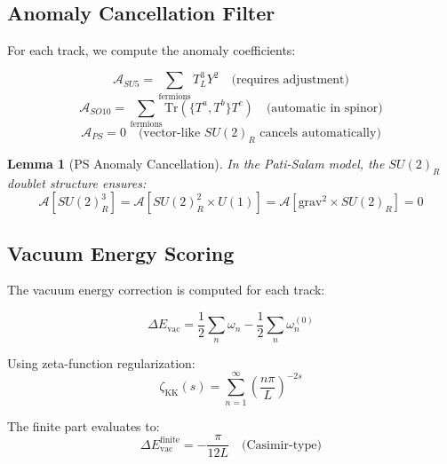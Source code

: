 \documentclass[11pt,a4paper]{article}
\newtheorem{lemma}[theorem]{Lemma}
\begin{document}
\subsection{Anomaly Cancellation Filter}
\label{subsec:anomaly-filter}

For each track, we compute the anomaly coefficients:

\begin{equation}
\label{eq:anomaly-su5}
\mathcal{A}_{SU5} = \sum_{\text{fermions}} T^3_L Y^2 \quad \text{(requires adjustment)}
\end{equation}
\begin{equation}
\label{eq:anomaly-so10}
\mathcal{A}_{SO10} = \sum_{\text{fermions}} \text{Tr}(\{T^a, T^b\} T^c) \quad \text{(automatic in spinor)}
\end{equation}
\begin{equation}
\label{eq:anomaly-ps}
\mathcal{A}_{PS} = 0 \quad \text{(vector-like $SU(2)_R$ cancels automatically)}
\end{equation}

\begin{lemma}[PS Anomaly Cancellation]
\label{lem:ps-anomaly}
In the Pati-Salam model, the $SU(2)_R$ doublet structure ensures:
\begin{equation}
\label{eq:ps-anomaly-cancel}
\mathcal{A}[SU(2)_R^3] = \mathcal{A}[SU(2)_R^2 \times U(1)] = \mathcal{A}[\text{grav}^2 \times SU(2)_R] = 0
\end{equation}
\end{lemma}

\subsection{Vacuum Energy Scoring}
\label{subsec:vacuum-scoring}

The vacuum energy correction is computed for each track:

\begin{equation}
\label{eq:delta-evac-general}
\Delta E_{\text{vac}} = \frac{1}{2} \sum_n \omega_n - \frac{1}{2} \sum_n \omega_n^{(0)}
\end{equation}

Using zeta-function regularization:
\begin{equation}
\label{eq:zeta-reg}
\zeta_{\text{KK}}(s) = \sum_{n=1}^{\infty} \left(\frac{n\pi}{L}\right)^{-2s}
\end{equation}

The finite part evaluates to:
\begin{equation}
\label{eq:zeta-finite}
\Delta E_{\text{vac}}^{\text{finite}} = -\frac{\pi}{12L} \quad \text{(Casimir-type)}
\end{equation}
\end{document}

